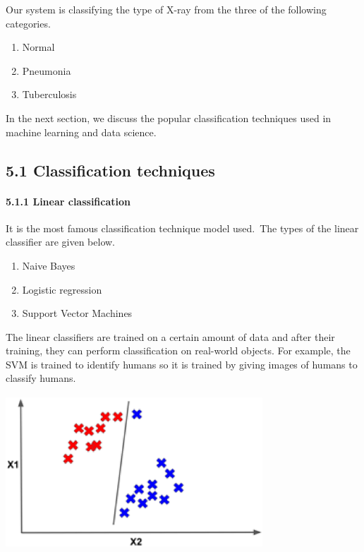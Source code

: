 \documentclass{article} %
\begin{document}
\noindent Our system is classifying the type of X-ray from the three of the following categories.

\begin{enumerate}
\item  Normal

\item  Pneumonia

\item  Tuberculosis
\end{enumerate}

\noindent In the next section, we discuss the popular classification techniques used in machine learning and data science.

\noindent 
\subsection{5.1 Classification techniques}

\noindent 
\paragraph{5.1.1 Linear classification }

\noindent It is the most famous classification technique model used.~The types of the linear classifier are given below.\textbf{}

\begin{enumerate}
\item \textbf{ }Naive Bayes

\item  Logistic regression

\item  Support Vector Machines
\end{enumerate}

\noindent The linear classifiers are trained on a certain amount of data and after their training, they can perform classification on real-world objects. For example, the SVM is trained to identify humans so it is trained by giving images of humans to classify humans.

\noindent \includegraphics*[width=3.79in, height=2.26in, keepaspectratio=false]{image20}
\end{document}
